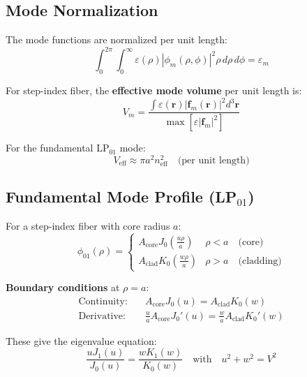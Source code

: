 \documentclass[12pt,a4paper]{article}
\begin{document}
\subsection{Mode Normalization}

The mode functions are normalized per unit length:
\begin{equation}
\int_0^{2\pi} \int_0^{\infty} \varepsilon(\rho)|\phi_m(\rho, \phi)|^2 \rho \, d\rho \, d\phi = \varepsilon_m \label{eq:mode_normalization}
\end{equation}

For step-index fiber, the \textbf{effective mode volume} per unit length is:
\begin{equation}
V_m = \frac{\int \varepsilon(\mathbf{r})|\mathbf{f}_m(\mathbf{r})|^2 d^3\mathbf{r}}{\max[\varepsilon|\mathbf{f}_m|^2]}
\end{equation}

For the fundamental LP$_{01}$ mode:
\begin{equation}
V_{\text{eff}} \approx \pi a^2 n_{\text{eff}}^2 \quad \text{(per unit length)} \label{eq:Veff_fiber}
\end{equation}

\subsection{Fundamental Mode Profile (LP$_{01}$)}

For a step-index fiber with core radius $a$:
\begin{equation}
\phi_{01}(\rho) = \begin{cases}
A_{\text{core}} J_0\left(\frac{u\rho}{a}\right) & \rho < a \quad \text{(core)}\\[0.5em]
A_{\text{clad}} K_0\left(\frac{w\rho}{a}\right) & \rho > a \quad \text{(cladding)}
\end{cases} \label{eq:LP01_profile}
\end{equation}

\textbf{Boundary conditions} at $\rho = a$:
\begin{align}
\text{Continuity:} \quad & A_{\text{core}} J_0(u) = A_{\text{clad}} K_0(w) \label{eq:BC_continuity}\\
\text{Derivative:} \quad & \frac{u}{a}A_{\text{core}} J_0'(u) = \frac{w}{a}A_{\text{clad}} K_0'(w) \label{eq:BC_derivative}
\end{align}

These give the eigenvalue equation:
\begin{equation}
\frac{u J_1(u)}{J_0(u)} = \frac{w K_1(w)}{K_0(w)} \quad \text{with} \quad u^2 + w^2 = V^2 \label{eq:eigenvalue_LP01}
\end{equation}
\end{document}
